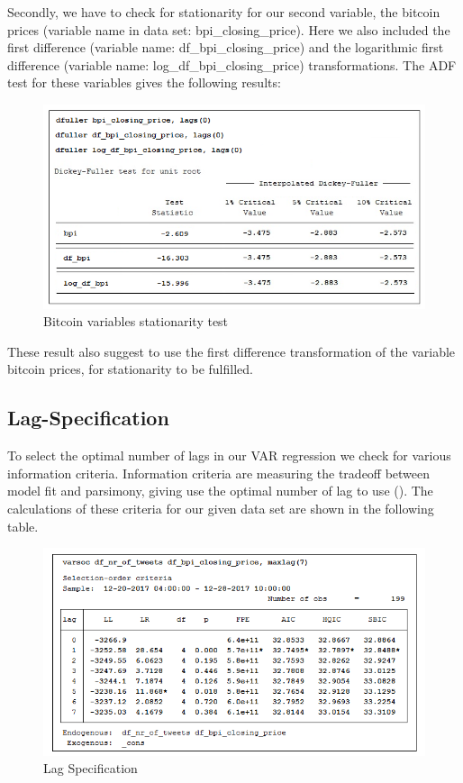 \documentclass[a4paper,american,12pt]{article}
\begin{document}
\begin{spacing}{1.2}
Secondly, we have to check for stationarity for our second variable, the bitcoin prices (variable name in data set: bpi\_closing\_price). Here we also included the first difference (variable name: df\_bpi\_closing\_price) and the logarithmic first difference (variable name: log\_df\_bpi\_closing\_price) transformations. The ADF test for these variables gives the following results:\\

\begin{figure}[H]
\centering
\includegraphics[scale=0.85]{stata_export_graphs/ADF_bpi_variables.png}
\caption{Bitcoin variables stationarity test}
\label{fig:4}
\end{figure}
	
These result also suggest to use the first difference transformation of the variable bitcoin prices, for stationarity to be fulfilled.

\subsection{Lag-Specification}
To select the optimal number of lags in our VAR regression we check for various information criteria. Information criteria are measuring the tradeoff between model fit and parsimony, giving use the optimal number of lag to use (\cite[p.~27]{brandt_williams_2007}). The calculations of these criteria for our given data set are shown in the following table.\\

\begin{figure}[H]
\centering
\includegraphics[scale=0.85]{stata_export_graphs/LAG_crit_df_nr_tweets_df_bpi.png}
\caption{Lag Specification}
\label{fig:5}
\end{figure}


\end{spacing}
\end{document}
